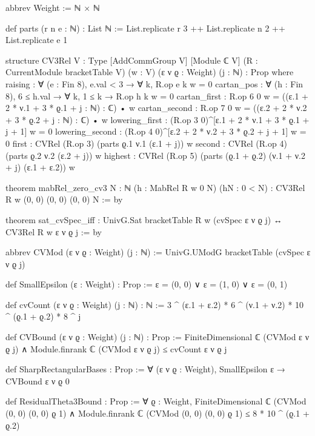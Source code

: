\begin{leancode}
abbrev Weight := ℕ × ℕ

def parts (r n e : ℕ) : List ℕ :=
  List.replicate r 3 ++ List.replicate n 2 ++ List.replicate e 1

structure CV3Rel {V : Type} [AddCommGroup V] [Module ℂ V]
    (R : CurrentModule bracketTable V) (w : V) (ε ν ϱ : Weight) (j : ℕ) : Prop where
  raising : ∀ (e : Fin 8), e.val < 3 → ∀ k, R.op e k w = 0
  cartan_pos : ∀ (h : Fin 8), 6 ≤ h.val → ∀ k, 1 ≤ k → R.op h k w = 0
  cartan_first : R.op 6 0 w = ((ε.1 + 2 * ν.1 + 3 * ϱ.1 + j : ℕ) : ℂ) • w
  cartan_second : R.op 7 0 w = ((ε.2 + 2 * ν.2 + 3 * ϱ.2 + j : ℕ) : ℂ) • w
  lowering_first : (R.op 3 0)^[ε.1 + 2 * ν.1 + 3 * ϱ.1 + j + 1] w = 0
  lowering_second : (R.op 4 0)^[ε.2 + 2 * ν.2 + 3 * ϱ.2 + j + 1] w = 0
  first : CVRel (R.op 3) (parts ϱ.1 ν.1 (ε.1 + j)) w
  second : CVRel (R.op 4) (parts ϱ.2 ν.2 (ε.2 + j)) w
  highest : CVRel (R.op 5) (parts (ϱ.1 + ϱ.2) (ν.1 + ν.2 + j) (ε.1 + ε.2)) w

theorem mabRel_zero_cv3 {N : ℕ} (h : MabRel R w 0 N) (hN : 0 < N) :
    CV3Rel R w (0, 0) (0, 0) (0, 0) N := by
\end{leancode}
\begin{leancode}
theorem sat_cvSpec_iff :
    UnivG.Sat bracketTable R w (cvSpec ε ν ϱ j) ↔ CV3Rel R w ε ν ϱ j := by

abbrev CVMod (ε ν ϱ : Weight) (j : ℕ) := UnivG.UModG bracketTable (cvSpec ε ν ϱ j)
\end{leancode}
\begin{leancode}
def SmallEpsilon (ε : Weight) : Prop := ε = (0, 0) ∨ ε = (1, 0) ∨ ε = (0, 1)

def cvCount (ε ν ϱ : Weight) (j : ℕ) : ℕ :=
  3 ^ (ε.1 + ε.2) * 6 ^ (ν.1 + ν.2) * 10 ^ (ϱ.1 + ϱ.2) * 8 ^ j

def CVBound (ε ν ϱ : Weight) (j : ℕ) : Prop :=
  FiniteDimensional ℂ (CVMod ε ν ϱ j) ∧
    Module.finrank ℂ (CVMod ε ν ϱ j) ≤ cvCount ε ν ϱ j

def SharpRectangularBases : Prop :=
  ∀ (ε ν ϱ : Weight), SmallEpsilon ε → CVBound ε ν ϱ 0

def ResidualTheta3Bound : Prop :=
  ∀ ϱ : Weight, FiniteDimensional ℂ (CVMod (0, 0) (0, 0) ϱ 1) ∧
    Module.finrank ℂ (CVMod (0, 0) (0, 0) ϱ 1) ≤ 8 * 10 ^ (ϱ.1 + ϱ.2)
\end{leancode}

